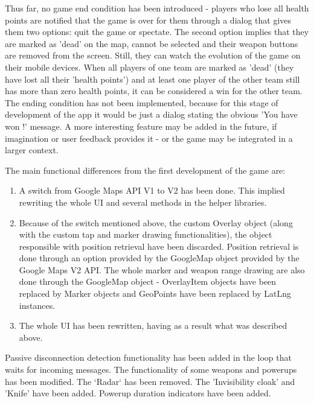 \documentclass{article}
\begin{document}
Thus far, no game end condition has been introduced - players who lose all
health points are notified that the game is over for them through a dialog that
gives them two options: quit the game or spectate. The second option implies
that they are marked as 'dead' on the map, cannot be selected and their weapon
buttons are removed from the screen. Still, they can watch the evolution of the
game on their mobile devices. When all players of one team are marked as 'dead'
(they have lost all their 'health points') and at least one player of the other
team still has more than zero health points, it can be considered a win for the
other team. The ending condition has not been implemented, because for this
stage of development of the app it would be just a dialog stating the obvious
'You have won !' message. A more interesting feature may be added in the future,
if imagination or user feedback provides it - or the game may be integrated in a
larger context.\newline

The main functional differences from the first development of the game are:

\begin{enumerate}
  \item A switch from Google Maps API V1 to V2 has been done. This implied
  rewriting the whole UI and several methods in the helper libraries.
  
  \item Because of the switch mentioned above, the custom Overlay object (along
  with the custom tap and marker drawing functionalities), the object
  responsible with position retrieval have been discarded. Position retrieval is
  done through an option provided by the GoogleMap object provided by the Google
  Maps V2 API. The whole marker and weapon range drawing are also done through
  the GoogleMap object - OverlayItem objects have been replaced by Marker
  objects and GeoPoints have been replaced by LatLng instances.
  
  \item The whole UI has been rewritten, having as a result what was described
  above.  
  
\end{enumerate}

Passive disconnection detection functionality has been added in the loop that
waits for incoming messages. The functionality of some weapons and powerups has
been modified. The `Radar` has been removed. The 'Invisibility cloak' and
'Knife' have been added. Powerup duration indicators have been added.\newline
\end{document}
